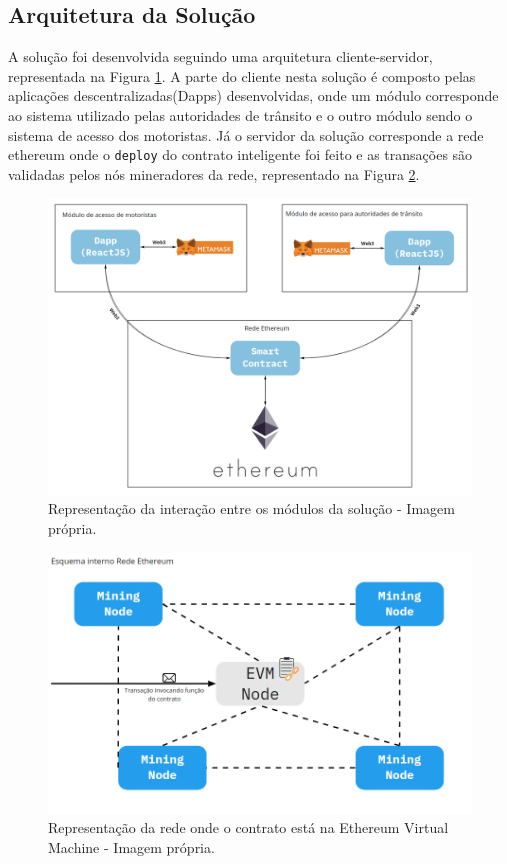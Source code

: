         
\subsection{Arquitetura da Solução}

A solução foi desenvolvida seguindo uma arquitetura cliente-servidor, representada na Figura \ref{fig:dapp_arquitetura_solucao}. A parte do cliente nesta solução é composto pelas aplicações descentralizadas(Dapps) desenvolvidas, onde um módulo corresponde ao sistema utilizado pelas autoridades de trânsito e o outro módulo sendo o sistema de acesso dos motoristas. Já o servidor da solução corresponde a rede ethereum onde o \verb|deploy| do contrato inteligente foi feito e as transações são validadas pelos nós mineradores da rede, representado na Figura \ref{fig:dapp_rede_ethereum}.

    \begin{figure}[h]
         \centering
         \includegraphics[scale=0.35]{figuras/capitulo_5/arquitetura_solucao.png}
         \caption{Representação da interação entre os módulos da solução - Imagem própria.}
         \label{fig:dapp_arquitetura_solucao}
    \end{figure}
                                                        
    \begin{figure}[h]
         \centering
         \includegraphics[scale=0.4]{figuras/capitulo_5/esquema_rede_ethereum.png}
         \caption{Representação da rede onde o contrato está na Ethereum Virtual Machine - Imagem própria.}
         \label{fig:dapp_rede_ethereum}
    \end{figure}
    

